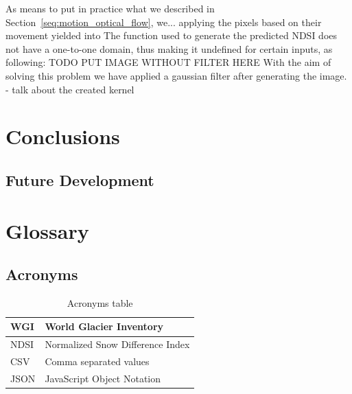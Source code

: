 \documentclass[11pt, a4paper]{report}
\begin{document}
	As means to put in practice what we described in Section~\ref{seq:motion_optical_flow}, we...
	applying the pixels based on their movement yielded into 
	The function used to generate the predicted NDSI does not have a one-to-one domain, thus making it undefined for certain inputs, as following:
	TODO PUT IMAGE WITHOUT FILTER HERE
	With the aim of solving this problem we have applied a gaussian filter after generating the image.
	- talk about the created kernel
	
	\tableofcontents{}
	\listoffigures{}
	\listoftables{}
	
	
	
	
	\chapter{Conclusions}
	\section{Future Development}
	\label{seq:future_development}
		
	\chapter{Glossary}
	
	
	\section{Acronyms}
	
		\begin{table} [H]
		\centering
		\begin{tabular} {|  l | L{10cm} |}
			\hline
			WGI & World Glacier Inventory \\ [0.2ex]
			\hline
			NDSI & Normalized Snow Difference Index \\ [0.2ex]
			\hline
			\hline
			CSV & Comma separated values \\ [0.2ex]
			\hline
			\hline
			JSON & JavaScript Object Notation \\ [0.2ex]
			\hline
		\end{tabular}
		\caption{Acronyms table }
		\label{table:acron}
	\end{table}
	
\end{document}
